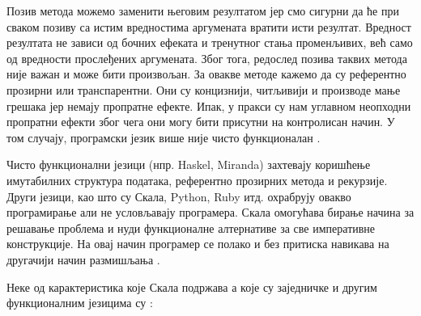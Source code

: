\documentclass[12pt,oneside]{memoir}
\begin{document}
Позив метода можемо заменити његовим резултатом јер смо сигурни да ће при сваком позиву са истим вредностима аргумената вратити исти резултат. Вредност резултата не зависи од бочних ефеката и тренутног стања променљивих, већ само од вредности прослеђених аргумената. Због тога, редослед позива таквих метода није важан и може бити произвољан. За овакве методе кажемо да су референтно прозирни или транспарентни. Они су концизнији, читљивији и производе мање грешака јер немају пропратне ефекте. Ипак, у пракси су нам углавном неопходни пропратни ефекти због чега они могу бити присутни на контролисан начин. У том случају, програмски језик више није чисто функционалан \cite{funkMilena}. 
\\
\par Чисто функционални језици (нпр. Haskel, Miranda) захтевају коришћење имутабилних структура података,  референтно прозирних метода и рекурзије. Други језици, као што су Скала, Python, Ruby итд. охрабрују овакво програмирање али не условљавају програмера. Скала омогућава бирање начина за решавање проблема и нуди функционалне алтернативе за све императивне конструкције. На овај начин програмер се полако и без притиска навикава на другачији начин размишљања \cite{funkMilena, progInScala}.
\par Неке од карактеристика које Скала подржава а које су заједничке и другим функционалним језицима су \cite{progInScala}:
\end{document}
